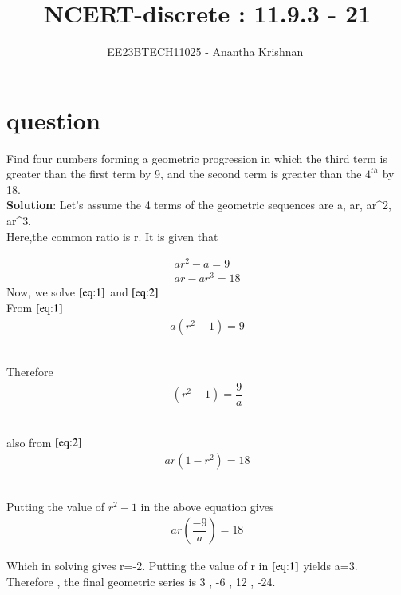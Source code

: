 \documentclass[journal,12pt,twocolumn]{IEEEtran}
\theoremstyle{remark}
\begin{document}

\vspace{3cm}

\title{NCERT-discrete : 11.9.3 - 21}
\author{EE23BTECH11025 - Anantha Krishnan $^{}$%
}
\maketitle
\newpage
\bigskip

\renewcommand{\thefigure}{\theenumi}
\renewcommand{\thetable}{\theenumi}
\section{question}
Find four numbers forming a geometric progression in which the third term is greater than the first term by 9, and the second term is greater than the $4^{th}$ by 18.\\

\textbf{Solution}:
Let's assume the 4 terms of the geometric sequences are a, ar, a{r^2}, a{r^3}.
\\

Here,the common ratio is r.
It is given that

\begin{align}
a{r^2}-a=9\label{eq:1} \\
ar-a{r^3}=18\label{eq:2}
\end{align}
Now, we solve $\eqref{eq:1}$ and $\eqref{eq:2}$\\
From $\eqref{eq:1}$
\begin{align}
         a(r^2-1)=9
         \end{align}

     
\\Therefore 
\begin{align}
         (r^2-1)=\dfrac{9}{a}
         \end{align}

     \\also from $\eqref{eq:2}$
     \begin{align}
     ar(1-r^2)=18
     \end{align}
     
     \\Putting the value of ${r^2}-1$ in the above equation gives 
     \begin{align}
              ar(\dfrac{-9}{a})=18
                   \end{align}

     Which in solving gives r=-2. Putting the value of r in $\eqref{eq:1}$ yields a=3.
     Therefore , the final geometric series is 3 , -6 , 12 , -24.





 
\end{document}
